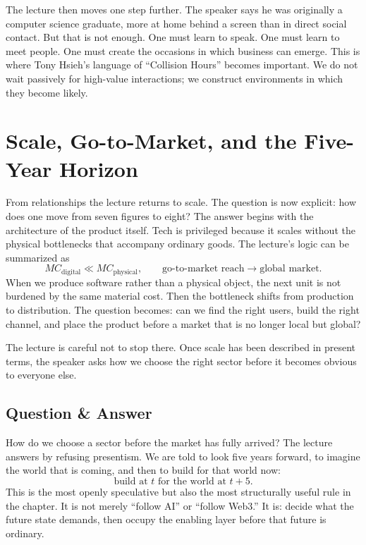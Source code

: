 The lecture then moves one step further. The speaker says he was originally a computer science graduate, more at home behind a screen than in direct social contact. But that is not enough. One must learn to speak. One must learn to meet people. One must create the occasions in which business can emerge. This is where Tony Hsieh's language of ``Collision Hours'' becomes important. We do not wait passively for high-value interactions; we construct environments in which they become likely.

\section{Scale, Go-to-Market, and the Five-Year Horizon}

From relationships the lecture returns to scale. The question is now explicit: how does one move from seven figures to eight? The answer begins with the architecture of the product itself. Tech is privileged because it scales without the physical bottlenecks that accompany ordinary goods. The lecture's logic can be summarized as
\begin{equation}
MC_{\text{digital}} \ll MC_{\text{physical}},
\qquad
\text{go-to-market reach} \to \text{global market}.
\end{equation}
When we produce software rather than a physical object, the next unit is not burdened by the same material cost. Then the bottleneck shifts from production to distribution. The question becomes: can we find the right users, build the right channel, and place the product before a market that is no longer local but global?

The lecture is careful not to stop there. Once scale has been described in present terms, the speaker asks how we choose the right sector before it becomes obvious to everyone else.

\subsection{Question \& Answer}

How do we choose a sector before the market has fully arrived? The lecture answers by refusing presentism. We are told to look five years forward, to imagine the world that is coming, and then to build for that world now:
\begin{equation}
\text{build at } t
\text{ for the world at } t+5.
\end{equation}
This is the most openly speculative but also the most structurally useful rule in the chapter. It is not merely ``follow AI'' or ``follow Web3.'' It is: decide what the future state demands, then occupy the enabling layer before that future is ordinary.

